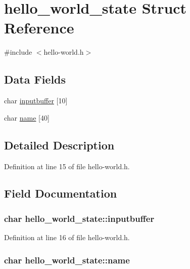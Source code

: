 \hypertarget{structhello__world__state}{
\section{hello\_\-world\_\-state Struct Reference}
\label{structhello__world__state}
}


{\ttfamily \#include $<$hello-\/world.h$>$}

\subsection*{Data Fields}
\begin{DoxyCompactItemize}
\item 
char \hyperlink{structhello__world__state_af2e82780358f4d0e5571a5ebab698531}{inputbuffer} \mbox{[}10\mbox{]}
\item 
char \hyperlink{structhello__world__state_a4a97d071fc35f8ee1eef0cd4b56791a6}{name} \mbox{[}40\mbox{]}
\end{DoxyCompactItemize}


\subsection{Detailed Description}


Definition at line 15 of file hello-\/world.h.



\subsection{Field Documentation}
\hypertarget{structhello__world__state_af2e82780358f4d0e5571a5ebab698531}{
\subsubsection[{inputbuffer}]{\setlength{\rightskip}{0pt plus 5cm}char {\bf hello\_\-world\_\-state::inputbuffer}}}
\label{structhello__world__state_af2e82780358f4d0e5571a5ebab698531}


Definition at line 16 of file hello-\/world.h.

\hypertarget{structhello__world__state_a4a97d071fc35f8ee1eef0cd4b56791a6}{
\subsubsection[{name}]{\setlength{\rightskip}{0pt plus 5cm}char {\bf hello\_\-world\_\-state::name}}}
\label{structhello__world__state_a4a97d071fc35f8ee1eef0cd4b56791a6}


